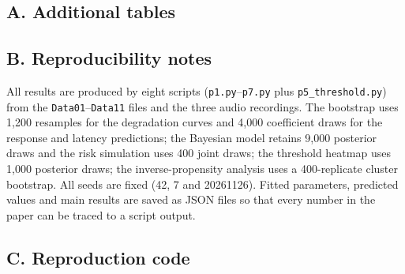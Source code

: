 \documentclass{apmcmthesis}
\begin{document}
\subsection*{A. Additional tables}







































\subsection*{B. Reproducibility notes}

All results are produced by eight scripts (\texttt{p1.py}--\texttt{p7.py} plus \texttt{p5\_threshold.py}) from the \texttt{Data01}--\texttt{Data11} files and the three audio recordings. The bootstrap uses 1{,}200 resamples for the degradation curves and 4{,}000 coefficient draws for the response and latency predictions; the Bayesian model retains 9{,}000 posterior draws and the risk simulation uses 400 joint draws; the threshold heatmap uses 1{,}000 posterior draws; the inverse-propensity analysis uses a 400-replicate cluster bootstrap. All seeds are fixed (42, 7 and 20261126). Fitted parameters, predicted values and main results are saved as JSON files so that every number in the paper can be traced to a script output.

\subsection*{C. Reproduction code}
\label{app:code}
\end{document}
